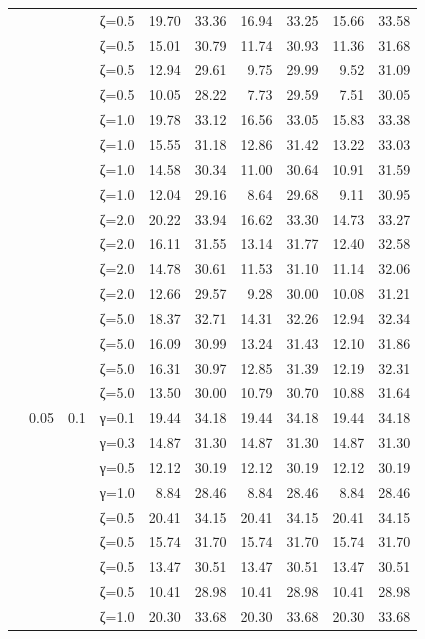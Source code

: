 \begin{table}[htbp]
\begin{tabular}{ll r l  rr  rr  rr}
  &  &  & ζ=0.5 & 19.70 & 33.36 & 16.94 & 33.25 & 15.66 & 33.58 \\
  &  &  & ζ=0.5 & 15.01 & 30.79 & 11.74 & 30.93 & 11.36 & 31.68 \\
  &  &  & ζ=0.5 & 12.94 & 29.61 & 9.75 & 29.99 & 9.52 & 31.09 \\
  &  &  & ζ=0.5 & 10.05 & 28.22 & 7.73 & 29.59 & 7.51 & 30.05 \\
  &  &  & ζ=1.0 & 19.78 & 33.12 & 16.56 & 33.05 & 15.83 & 33.38 \\
  &  &  & ζ=1.0 & 15.55 & 31.18 & 12.86 & 31.42 & 13.22 & 33.03 \\
  &  &  & ζ=1.0 & 14.58 & 30.34 & 11.00 & 30.64 & 10.91 & 31.59 \\
  &  &  & ζ=1.0 & 12.04 & 29.16 & 8.64 & 29.68 & 9.11 & 30.95 \\
  &  &  & ζ=2.0 & 20.22 & 33.94 & 16.62 & 33.30 & 14.73 & 33.27 \\
  &  &  & ζ=2.0 & 16.11 & 31.55 & 13.14 & 31.77 & 12.40 & 32.58 \\
  &  &  & ζ=2.0 & 14.78 & 30.61 & 11.53 & 31.10 & 11.14 & 32.06 \\
  &  &  & ζ=2.0 & 12.66 & 29.57 & 9.28 & 30.00 & 10.08 & 31.21 \\
  &  &  & ζ=5.0 & 18.37 & 32.71 & 14.31 & 32.26 & 12.94 & 32.34 \\
  &  &  & ζ=5.0 & 16.09 & 30.99 & 13.24 & 31.43 & 12.10 & 31.86 \\
  &  &  & ζ=5.0 & 16.31 & 30.97 & 12.85 & 31.39 & 12.19 & 32.31 \\
  &  &  & ζ=5.0 & 13.50 & 30.00 & 10.79 & 30.70 & 10.88 & 31.64 \\
  & 0.05 & 0.1 & γ=0.1 & 19.44 & 34.18 & 19.44 & 34.18 & 19.44 & 34.18 \\
  &  &  & γ=0.3 & 14.87 & 31.30 & 14.87 & 31.30 & 14.87 & 31.30 \\
  &  &  & γ=0.5 & 12.12 & 30.19 & 12.12 & 30.19 & 12.12 & 30.19 \\
  &  &  & γ=1.0 & 8.84 & 28.46 & 8.84 & 28.46 & 8.84 & 28.46 \\
  &  &  & ζ=0.5 & 20.41 & 34.15 & 20.41 & 34.15 & 20.41 & 34.15 \\
  &  &  & ζ=0.5 & 15.74 & 31.70 & 15.74 & 31.70 & 15.74 & 31.70 \\
  &  &  & ζ=0.5 & 13.47 & 30.51 & 13.47 & 30.51 & 13.47 & 30.51 \\
  &  &  & ζ=0.5 & 10.41 & 28.98 & 10.41 & 28.98 & 10.41 & 28.98 \\
  &  &  & ζ=1.0 & 20.30 & 33.68 & 20.30 & 33.68 & 20.30 & 33.68 \\

\end{tabular}
\end{table}

